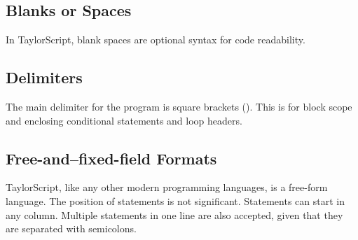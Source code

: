 \subsection{Blanks or Spaces}
In TaylorScript, blank spaces are optional syntax for code readability.

\subsection{Delimiters}
The main delimiter for the program is square brackets (\cd{[]}). This is for block scope and enclosing conditional statements and loop headers.

\subsection{Free-and--fixed-field Formats}
TaylorScript, like any other modern programming languages, is a free-form language. The position of statements is not significant. Statements can start in any column. Multiple statements in one line are also accepted, given that they are separated with semicolons.